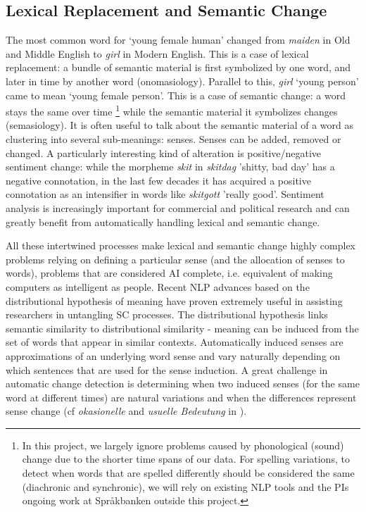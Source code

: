 \documentclass[12pt,twoside,a4paper]{article}
\begin{document}
    \subsection*{Lexical Replacement and Semantic Change}
The most common word for ‘young female human’ changed from \textit{maiden} in Old and Middle English to \textit{girl} in Modern English. This is a case of lexical replacement: a bundle of semantic material is first symbolized by one word, and later in time by another word (onomasiology). Parallel to this, \textit{girl} ‘young person’
came to mean ‘young female person’. This is a case of semantic change: a word stays the same over time    \footnote{In this project, we largely ignore problems caused by phonological (sound) change due to the shorter time spans of our data. For spelling variations, to detect when words that are spelled differently should be considered the same (diachronic and synchronic),  we will rely on existing NLP tools and the PIs ongoing work at Språkbanken outside this project.}
   while the semantic material it symbolizes changes (semasiology). It is often useful to talk about the semantic material of a word as clustering into several sub-meanings: senses. Senses can be added, removed or changed. A particularly interesting kind of alteration is positive/negative sentiment change: while the morpheme \textit{skit} in \textit{skitdag} 'shitty, bad day' has a negative connotation, in the last few decades it has acquired a positive connotation as an intensifier in words like \textit{skitgott} 'really good'. Sentiment analysis is increasingly important for commercial and political research and can greatly benefit from automatically handling lexical and semantic change. 
    
    
All these intertwined processes make lexical and semantic change highly complex problems relying on defining a particular sense (and the allocation of senses to words), problems that are considered AI complete, i.e. equivalent of making computers as intelligent as people. Recent NLP advances based on the distributional hypothesis of meaning have proven extremely useful in assisting researchers in untangling SC processes. The distributional hypothesis links semantic similarity to distributional similarity - meaning can be induced from the set of words that appear in similar contexts. 
	Automatically induced senses are approximations of an underlying word sense and vary naturally depending on which sentences that are used for the sense induction. A great challenge in automatic change detection is determining when two induced senses (for the same word at different times) are natural variations and when the differences represent sense change (cf \textit{okasionelle} and \textit{usuelle Bedeutung} in \cite{Paul_1886}). 
	
\end{document}
